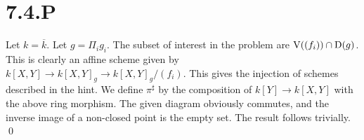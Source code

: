 \documentclass{article}
\begin{document}
\section{7.4.P}
Let $k=\overline{k}$. Let $g=\Pi_i g_i$. The subset of
interest in the problem are $\operatorname{V}((f_i)) \cap \operatorname{D}(g)$. This is clearly an affine
scheme given by $k[X, Y] \to k[X, Y]_g \to
    k[X, Y]_g/(f_i)$. This gives the injection of schemes
described in the hint. We define $\pi^{\sharp}$ by the composition of
$k[Y] \to k[X, Y]$ with the above ring morphism. The given diagram
obviously commutes, and the inverse image of a non-closed point is the empty
set. The result follows trivially. \qed
\end{document}
